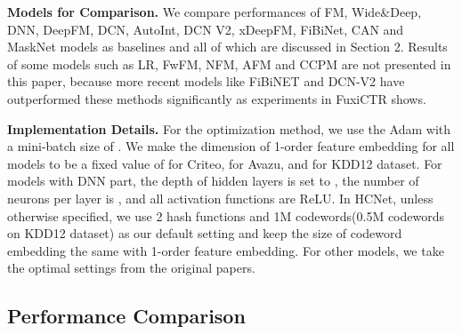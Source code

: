 \documentclass[sigconf,authorversion]{acmart}
\begin{document}
\textbf{Models for Comparison.}
We compare performances of FM\cite{rendle2010factorization}, Wide\&Deep\cite{cheng2016wide}, DNN\cite{zhang2016deep}, DeepFM\cite{guo2017deepfm}, DCN\cite{wang2017deep}, AutoInt\cite{song2019autoint}, DCN V2\cite{WangSCJLHC21}, xDeepFM\cite{lian2018xdeepfm}, FiBiNet\cite{HuangZZ19}, CAN\cite{zhou2020can}
and MaskNet\cite{masknet} models as baselines and all of which are discussed in Section 2. Results of some models such as LR\cite{he2014practical}, FwFM\cite{pan2018field}, NFM\cite{nfm}, AFM\cite{xiao2017attentional} and CCPM\cite{ccpm} are not presented in this paper, because more recent models like FiBiNET\cite{HuangZZ19} and DCN-V2\cite{WangSCJLHC21} have  outperformed these methods significantly as experiments in FuxiCTR\cite{jieming-2009-05794} shows.

\textbf{Implementation Details.}
For the optimization method, we use the Adam\cite{adam} with a mini-batch size of .  We make the dimension of 1-order feature embedding for all models to be a fixed value of  for Criteo,   for Avazu, and  for KDD12 dataset.  For models with DNN part, the depth of hidden layers is set to , the number of neurons per layer is , and all activation functions are ReLU. In HCNet, unless otherwise specified, we use 2 hash functions and 1M codewords(0.5M codewords on KDD12 dataset) as our default setting and keep the size of codeword embedding the same with 1-order feature embedding. For other models, we take the optimal settings from the original papers.

\subsection{Performance Comparison}
\end{document}

